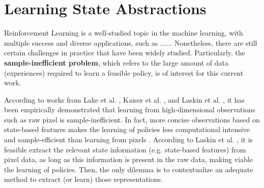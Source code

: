 \section{Learning State Abstractions}


Reinforcement Learning is a well-studied topic in the machine learning, with multiple success and diverse applications, such as ...... Nonetheless, there are still certain challenges in practice that have been widely studied. Particularly, the \textbf{sample-inefficient problem}, which refers to the large amount of data (experiences) required to learn a feasible policy, is of interest for this current work. 

According to works from Lake et al. \cite{lake2017building}, Kaiser et al. \cite{kaiser2019model}, and Laskin et al. \cite{laskin2020curl}, it has been empirically demonstrated that learning from high-dimensional observations such as raw pixel is sample-inefficient. In fact, more concise observations based on state-based features makes the learning of policies less computational intensive and sample-efficient than learning from pixels \cite{tassa2018deepmind}. According to Laskin et al. \cite{laskin2020curl}, it is feasible extract the relevant state information (e.g. state-based features) from pixel data, as long as this information is present in the raw data, making viable the learning of policies. Then, the only dilemma is to contextualize an adequate method to extract (or learn) those representations. 


